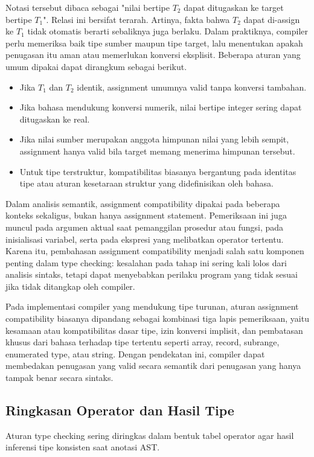 Notasi tersebut dibaca sebagai "nilai bertipe $T_2$ dapat ditugaskan ke target bertipe $T_1$". Relasi ini bersifat terarah. Artinya, fakta bahwa $T_2$ dapat di-assign ke $T_1$ tidak otomatis berarti sebaliknya juga berlaku. Dalam praktiknya, compiler perlu memeriksa baik tipe sumber maupun tipe target, lalu menentukan apakah penugasan itu aman atau memerlukan konversi eksplisit. Beberapa aturan yang umum dipakai dapat dirangkum sebagai berikut.

\begin{itemize}
    \item Jika $T_1$ dan $T_2$ identik, assignment umumnya valid tanpa konversi tambahan.
    \item Jika bahasa mendukung konversi numerik, nilai bertipe integer sering dapat ditugaskan ke real.
    \item Jika nilai sumber merupakan anggota himpunan nilai yang lebih sempit, assignment hanya valid bila target memang menerima himpunan tersebut.
    \item Untuk tipe terstruktur, kompatibilitas biasanya bergantung pada identitas tipe atau aturan kesetaraan struktur yang didefinisikan oleh bahasa.
\end{itemize}

Dalam analisis semantik, assignment compatibility dipakai pada beberapa konteks sekaligus, bukan hanya assignment statement. Pemeriksaan ini juga muncul pada argumen aktual saat pemanggilan prosedur atau fungsi, pada inisialisasi variabel, serta pada ekspresi yang melibatkan operator tertentu. Karena itu, pembahasan assignment compatibility menjadi salah satu komponen penting dalam type checking: kesalahan pada tahap ini sering kali lolos dari analisis sintaks, tetapi dapat menyebabkan perilaku program yang tidak sesuai jika tidak ditangkap oleh compiler.

Pada implementasi compiler yang mendukung tipe turunan, aturan assignment compatibility biasanya dipandang sebagai kombinasi tiga lapis pemeriksaan, yaitu kesamaan atau kompatibilitas dasar tipe, izin konversi implisit, dan pembatasan khusus dari bahasa terhadap tipe tertentu seperti array, record, subrange, enumerated type, atau string. Dengan pendekatan ini, compiler dapat membedakan penugasan yang valid secara semantik dari penugasan yang hanya tampak benar secara sintaks.

\subsection{Ringkasan Operator dan Hasil Tipe}
Aturan type checking sering diringkas dalam bentuk tabel operator agar hasil inferensi tipe konsisten saat anotasi AST.

